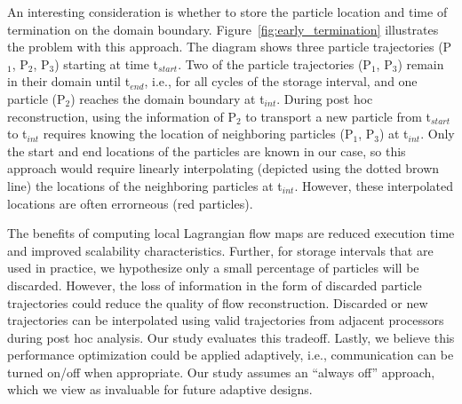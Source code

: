 %
An interesting consideration is whether to store the particle location and time of termination on the domain boundary.
%
Figure~\ref{fig:early_termination} illustrates the problem with this approach.
%
The diagram shows three particle trajectories (P$_{1}$, P$_{2}$, P$_{3}$) starting at time t$_{start}$.
%
Two of the particle trajectories (P$_{1}$, P$_{3}$) remain in their domain until t$_{end}$, i.e., for all cycles of the storage interval, and one particle (P$_{2}$) reaches the domain boundary at t$_{int}$.
%
During post hoc reconstruction, using the information of P$_{2}$ to transport a new particle from t$_{start}$ to t$_{int}$ requires knowing the location of neighboring particles (P$_{1}$, P$_{3}$) at t$_{int}$.
%
Only the start and end locations of the particles are known in our case, so this approach would require linearly interpolating (depicted using the dotted brown line) the locations of the neighboring particles at t$_{int}$.
%
However, these interpolated locations are often errorneous (red particles).
%
%

The benefits of computing local Lagrangian flow maps are reduced execution time and improved scalability characteristics. 
%
Further, for storage intervals that are used in practice, we hypothesize only a small percentage of particles will be discarded.
%
However, the loss of information in the form of discarded particle trajectories could reduce the quality of flow reconstruction.
%
Discarded or new trajectories can be interpolated using valid trajectories from adjacent processors during post hoc analysis.
%
Our study evaluates this tradeoff.
%
Lastly, we believe this performance optimization could be applied adaptively, i.e., communication can be turned on/off when appropriate.
%
Our study assumes an ``always off'' approach, which we view as invaluable for future adaptive designs.
%
%


